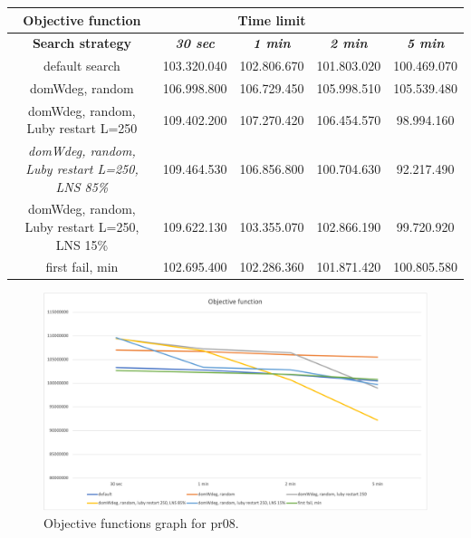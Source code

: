 {
\renewcommand{\arraystretch}{2}
\begin{longtable}[h]{| c | c | c | c | c |}
    \hline
    \textbf{Objective function} & \multicolumn{3}{c}{Time limit} & \\
    \hline
    \textbf{Search strategy} & \textbf{\textit{30 sec}} & \textbf{\textit{1 min}} & \textbf{\textit{2 min}} & \textbf{\textit{5 min}} \\
    \hline
    \endhead
    default search                                         & 103.320.040 & 102.806.670 & 101.803.020 & 100.469.070 \\
    \hline
    domWdeg, random                                        & 106.998.800 & 106.729.450 & 105.998.510 & 105.539.480 \\
    \hline
    domWdeg, random, Luby restart L=250                    & 109.402.200 & 107.270.420 & 106.454.570 &  98.994.160 \\
    \hline
    \textit{domWdeg, random, Luby restart L=250, LNS 85\%} & 109.464.530 & 106.856.800 & 100.704.630 &  92.217.490 \\
    \hline
    domWdeg, random, Luby restart L=250, LNS 15\%          & 109.622.130 & 103.355.070 & 102.866.190 &  99.720.920 \\
    \hline
    first fail, min                                        & 102.695.400 & 102.286.360 & 101.871.420 & 100.805.580 \\
    \hline
\end{longtable}
}
\begin{figure}[H]
    \centering
    \includegraphics[width=1.0\columnwidth]{../graphs/pr08-objf.png}
    \caption{Objective functions graph for pr08.}
\end{figure}

